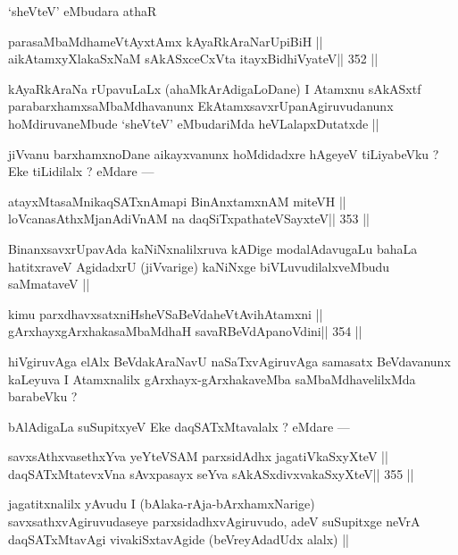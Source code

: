 \begin{artha}
`sheVteV' eMbudara athaR
\end{artha}

\begin{shl}
parasaMbaMdhameVtAyxtAmx kAyaRkAraNarUpiBiH ||
aikAtamxyXlakaSxNaM sAkASxceCxVta itayxBidhiVyateV\hfill || 352 ||
\end{shl}

\begin{artha}
kAyaRkAraNa rUpavuLaLx (ahaMkArAdigaLoDane) I Atamxnu sAkASxtf 
parabarxhamxsaMbaMdhavanunx EkAtamxsavxrUpanAgiruvudanunx 
hoMdiruvaneMbude `sheVteV' eMbudariMda heVLalapxDutatxde ||
\end{artha}

\begin{artha}
jiVvanu barxhamxnoDane aikayxvanunx hoMdidadxre hAgeyeV tiLiyabeVku ? Eke tiLidilalx ? eMdare ---
\end{artha}

\begin{shl}
atayxMtasaMnikaqSATxnAmapi BinAnxtamxnAM miteVH ||
loVcanasAthxMjanAdiVnAM na daqSiTxpathateVSayxteV\hfill || 353 ||
\end{shl}

\begin{artha}
BinanxsavxrUpavAda kaNiNxnalilxruva kADige modalAdavugaLu bahaLa 
hatitxraveV AgidadxrU (jiVvarige) kaNiNxge biVLuvudilalxveMbudu saMmataveV ||
\end{artha}

\begin{shl}
kimu parxdhavxsatxniHsheVSaBeVdaheVtAvihA\s\s tamxni ||
gArxhayxgArxhakasaMbaMdhaH savaRBeVdApanoVdini\hfill || 354 ||
\end{shl}

\begin{artha}
hiVgiruvAga elAlx BeVdakAraNavU naSaTxvAgiruvAga samasatx BeVdavanunx kaLeyuva I Atamxnalilx gArxhayx-gArxhakaveMba saMbaMdhavelilxMda barabeVku ?
\end{artha}

\begin{artha}
bAlAdigaLa suSupitxyeV Eke daqSATxMtavalalx ? eMdare ---
\end{artha}

\begin{shl}
savxsAthxvasethxYva yeYteVSAM parxsidAdhx jagatiVkaSxyXteV ||
daqSATxMtatevxVna sAvxpasayx seYva sAkASxdivxvakaSxyXteV\hfill || 355 ||
\end{shl}

\begin{artha}
jagatitxnalilx yAvudu I (bAlaka-rAja-bArxhamxNarige) 
savxsathxvAgiruvudaseye parxsidadhxvAgiruvudo, adeV suSupitxge neVrA 
daqSATxMtavAgi vivakiSxtavAgide (beVreyAdadUdx alalx) ||
\end{artha}

